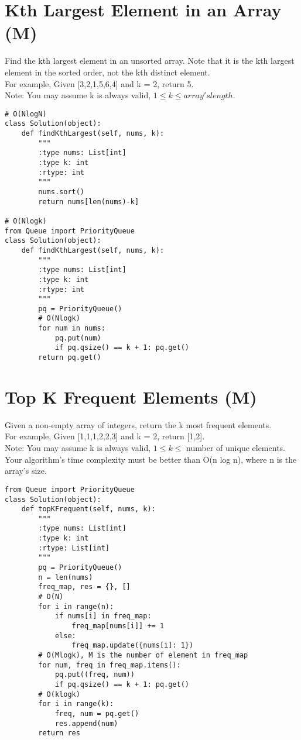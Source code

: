\section{Kth Largest Element in an Array (M)}
Find the kth largest element in an unsorted array. Note that it is the kth largest element in the sorted order, not the kth distinct element.\\

For example,
Given [3,2,1,5,6,4] and k = 2, return 5.\\

Note:
You may assume k is always valid, $1 \leq k \leq array's length$.\\

\begin{lstlisting}
# O(NlogN)
class Solution(object):
    def findKthLargest(self, nums, k):
        """
        :type nums: List[int]
        :type k: int
        :rtype: int
        """
        nums.sort()
        return nums[len(nums)-k]
        
# O(Nlogk)
from Queue import PriorityQueue
class Solution(object):
    def findKthLargest(self, nums, k):
        """
        :type nums: List[int]
        :type k: int
        :rtype: int
        """
        pq = PriorityQueue()
        # O(Nlogk)
        for num in nums:
            pq.put(num)
            if pq.qsize() == k + 1: pq.get()
        return pq.get()
\end{lstlisting}

\section{Top K Frequent Elements (M)}
Given a non-empty array of integers, return the k most frequent elements.\\

For example,
Given [1,1,1,2,2,3] and k = 2, return [1,2].\\

Note:
    You may assume k is always valid, $1 \leq k \leq $ number of unique elements.\\
    Your algorithm's time complexity must be better than O(n log n), where n is the array's size.\\

\begin{lstlisting}
from Queue import PriorityQueue
class Solution(object):
    def topKFrequent(self, nums, k):
        """
        :type nums: List[int]
        :type k: int
        :rtype: List[int]
        """
        pq = PriorityQueue()
        n = len(nums)
        freq_map, res = {}, []
        # O(N)
        for i in range(n):
            if nums[i] in freq_map:
                freq_map[nums[i]] += 1
            else:
                freq_map.update({nums[i]: 1})
        # O(Mlogk), M is the number of element in freq_map
        for num, freq in freq_map.items():
            pq.put((freq, num))
            if pq.qsize() == k + 1: pq.get()
        # O(klogk)
        for i in range(k):
            freq, num = pq.get()
            res.append(num)
        return res
\end{lstlisting}        
        
